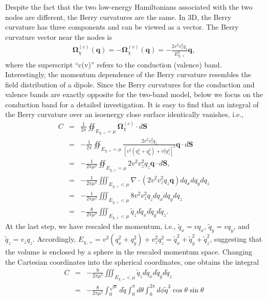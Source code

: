 \documentclass[aps,prl,twocolumn,longbibliography]{revtex4-1}
\newcommand{\bq}{\boldsymbol q}
\newcommand{\bOmega}{\boldsymbol{\Omega}}
\newcommand{\bS}{\boldsymbol{S}}
\begin{document}
\begin{widetext}
Despite the fact that the two low-energy Hamiltonians associated with the two nodes are different, the Berry curvatures are the same.
In 3D, the Berry curvature has three components and can be viewed as a vector. The Berry curvature vector near the nodes is
\begin{eqnarray}
	\bOmega_{\chi}^{(c)}(\bq)=-\bOmega_{\chi}^{(v)}(\bq)=-\frac{2v^{2}v_{z}^{2}q_{z}}{E_{\chi,+}^{2}}\bq,
\end{eqnarray}
where the superscript ``c(v)'' refers to the conduction (valence) band. Interestingly,
the momentum dependence of the Berry curvature resembles the field distribution of a dipole.
Since the Berry curvatures for the conduction and valence bands are exactly opposite for the two-band model, below
we focus on the conduction band for a detailed investigation.  It is easy to find that an integral of the Berry curvature
over an isoenergy close surface identically vanishes, i.e.,
\begin{eqnarray}
	C&=&\frac{1}{2\pi}\oiint_{E_{\chi,+}=\mu}\bOmega_{\chi}^{(c)}\cdot d\bS\nonumber\\
&=&-\frac{1}{2\pi}\oiint_{E_{\chi,+}=\mu}\frac{2v^{2}v_{z}^{2}q_{z}}{[v^{2}(q_{x}^{2}+q_{y}^{2})+v_{z}^{2}q_{z}^{2}]^{2}}\bq\cdot d\bS\nonumber\\
&=&-\frac{1}{2\pi\mu^{2}}\oiint_{E_{\chi,+}=\mu}2v^{2}v_{z}^{2}q_{z}\bq\cdot d\bS,\nonumber\\
&=&-\frac{1}{2\pi\mu^{2}}\iiint_{E_{\chi,+}<\mu}\nabla\cdot(2v^{2}v_{z}^{2}q_{z}\bq)dq_{x}dq_{y}dq_{z}\nonumber\\
&=&-\frac{1}{2\pi\mu^{2}}\iiint_{E_{\chi,+}<\mu}8v^{2}v_{z}^{2}q_{z}dq_{x}dq_{y}dq_{z}\nonumber\\
&=&-\frac{8}{2\pi\mu^{2}}\iiint_{E_{\chi,+}<\mu}\tilde{q}_{z}d\tilde{q}_{x}d\tilde{q}_{y}d\tilde{q}_{z}.
	\label{def: Hopf point1}
\end{eqnarray}
At the last step, we have rescaled the momentum, i.e., $\tilde{q}_{x}=vq_{x}$, $\tilde{q}_{y}=vq_{y}$,
and $\tilde{q}_{z}=v_{z}q_{z}$. Accordingly, $E_{\chi,+}=v^{2}(q_{x}^{2}+q_{y}^{2})+v_{z}^{2}q_{z}^{2}=\tilde{q}_{x}^{2}
+\tilde{q}_{y}^{2}+\tilde{q}_{z}^{2}$, suggesting that the volume is enclosed by a sphere in the rescaled momentum
space.  Changing the Cartesian coordinates into the spherical coordinates, one obtains the integral
\begin{eqnarray}
C&=&-\frac{8}{2\pi\mu^{2}}\iiint_{E_{\chi,+}<\mu}\tilde{q}_{z}d\tilde{q}_{x}d\tilde{q}_{y}d\tilde{q}_{z}\nonumber\\
&=&-\frac{8}{2\pi\mu^{2}}\int_{0}^{\sqrt{\mu}}d\tilde{q}\int_{0}^{\pi}d\theta\int_{0}^{2\pi}d\phi \tilde{q}^{3}\cos\theta\sin\theta\nonumber\\

\end{eqnarray}
\end{widetext}
\end{document}
